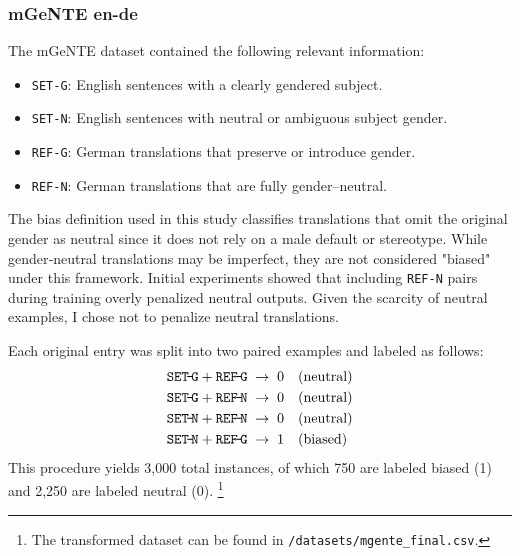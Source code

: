 \subsubsection{mGeNTE en-de} The mGeNTE dataset contained the following relevant information:  

\begin{itemize}  
  \item \texttt{SET-G}: English sentences with a clearly gendered subject.  
  \item \texttt{SET-N}: English sentences with neutral or ambiguous subject gender.  
  \item \texttt{REF-G}: German translations that preserve or introduce gender.  
  \item \texttt{REF-N}: German translations that are fully gender–neutral.  
\end{itemize}  

\noindent
The bias definition used in this study classifies translations that omit the original gender as neutral since it does not rely on a male default or stereotype. While gender‑neutral translations may be imperfect, they are not considered "biased" under this framework. Initial experiments showed that including \texttt{REF-N} pairs during training overly penalized neutral outputs. Given the scarcity of neutral examples, I chose not to penalize neutral translations. 

Each original entry was split into two paired examples and labeled as follows:  
\[
\begin{aligned}
\texttt{SET\!-\!G} + \texttt{REF\!-\!G} &\;\rightarrow\; 0 \quad(\text{neutral})\\
\texttt{SET\!-\!G} + \texttt{REF\!-\!N} &\;\rightarrow\; 0 \quad(\text{neutral})\\
\texttt{SET\!-\!N} + \texttt{REF\!-\!N} &\;\rightarrow\; 0 \quad(\text{neutral})\\
\texttt{SET\!-\!N} + \texttt{REF\!-\!G} &\;\rightarrow\; 1 \quad(\text{biased})
\end{aligned}
\]  
This procedure yields 3,000 total instances, of which 750 are labeled biased (1) and 2,250 are labeled neutral (0). \footnote{The transformed dataset can be found in \texttt{/datasets/mgente\_final.csv}.} 

